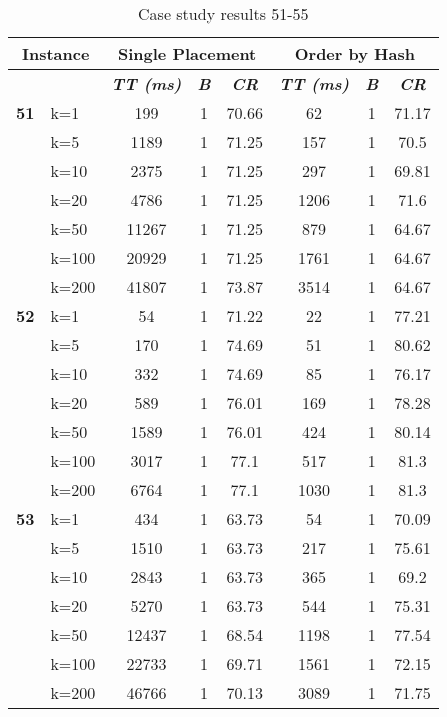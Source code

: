     \begin{table}[htbp]
    \caption{Case study results 51-55}
    \centering
    \begin{tabular}{|l|l|c|c|c|c|c|c|}
    \hline
    \multicolumn{ 2}{|c|}{\textbf{Instance}} & \multicolumn{ 3}{c|}{\textbf{Single Placement}} & \multicolumn{ 3}{c|}{\textbf{Order by Hash}} \\ \hline
    \multicolumn{ 2}{|l|}{} & \textbf{\textit{TT (ms)}} & \textbf{\textit{B}} & \textbf{\textit{CR}} & \textbf{\textit{TT (ms)}} & \textbf{\textit{B}} & \textbf{\textit{CR}} \\ \hline
    \multicolumn{1}{|r|}{\textbf{51}} & k=1 & 199 & 1 & 70.66 & 62 & 1 & 71.17 \\ 
     & k=5 & 1189 & 1 & 71.25 & 157 & 1 & 70.5 \\ 
     & k=10 & 2375 & 1 & 71.25 & 297 & 1 & 69.81 \\ 
     & k=20 & 4786 & 1 & 71.25 & 1206 & 1 & 71.6 \\ 
     & k=50 & 11267 & 1 & 71.25 & 879 & 1 & 64.67 \\ 
     & k=100 & 20929 & 1 & 71.25 & 1761 & 1 & 64.67 \\ 
     & k=200 & 41807 & 1 & 73.87 & 3514 & 1 & 64.67 \\ \hline
    \multicolumn{1}{|r|}{\textbf{52}} & k=1 & 54 & 1 & 71.22 & 22 & 1 & 77.21 \\ 
     & k=5 & 170 & 1 & 74.69 & 51 & 1 & 80.62 \\ 
     & k=10 & 332 & 1 & 74.69 & 85 & 1 & 76.17 \\ 
     & k=20 & 589 & 1 & 76.01 & 169 & 1 & 78.28 \\ 
     & k=50 & 1589 & 1 & 76.01 & 424 & 1 & 80.14 \\ 
     & k=100 & 3017 & 1 & 77.1 & 517 & 1 & 81.3 \\ 
     & k=200 & 6764 & 1 & 77.1 & 1030 & 1 & 81.3 \\ \hline
    \multicolumn{1}{|r|}{\textbf{53}} & k=1 & 434 & 1 & 63.73 & 54 & 1 & 70.09 \\ 
     & k=5 & 1510 & 1 & 63.73 & 217 & 1 & 75.61 \\ 
     & k=10 & 2843 & 1 & 63.73 & 365 & 1 & 69.2 \\ 
     & k=20 & 5270 & 1 & 63.73 & 544 & 1 & 75.31 \\ 
     & k=50 & 12437 & 1 & 68.54 & 1198 & 1 & 77.54 \\ 
     & k=100 & 22733 & 1 & 69.71 & 1561 & 1 & 72.15 \\ 
     & k=200 & 46766 & 1 & 70.13 & 3089 & 1 & 71.75 \\ \hline

\end{tabular}
\end{table}
